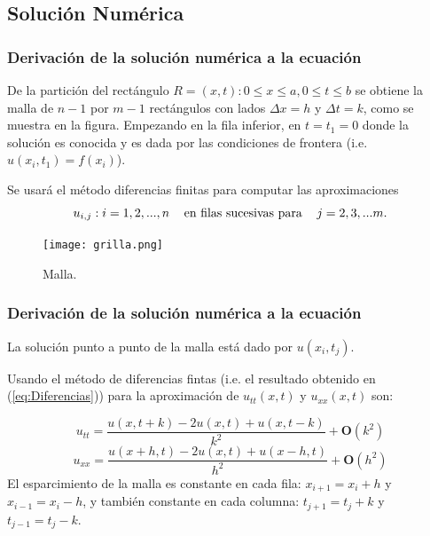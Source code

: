 \documentclass{beamer}
\begin{document}
\begin{frame}
\section{Solución Numérica}
\frametitle{Derivación de la solución numérica a la ecuación}
De la partición del rectángulo $R={(x,t):0\leq x\leq a, 0\leq t\leq b}$ se obtiene la malla de $n-1$ por $m-1$ rectángulos con lados $\Delta x =h$ y $\Delta  t=k$, como se muestra en la figura.
Empezando en la fila inferior, en $t=t_1=0$ donde la solución es conocida y es dada por las condiciones de frontera (i.e. $u(x_i,t_1)=f(x_i)$).

Se usará el método diferencias finitas para computar las aproximaciones
\begin{equation*}
    {u_{i,j}:i=1,2,...,n}\hspace{0.3cm} \text{ en filas sucesivas para }\hspace{0.3cm} j=2,3,...m.
\end{equation*}

\begin{figure}[h]
\centering
\texttt{[image: grilla.png]}
\caption{\label{fig:PenduloBalistico}Malla.}
\end{figure}
\end{frame}


\begin{frame}
\frametitle{Derivación de la solución numérica a la ecuación}
La solución punto a punto de la malla está dado por $u(x_i,t_j)$.
\newline

Usando el método de diferencias fintas (i.e. el resultado obtenido en (\ref{eq:Diferencias})) para la  aproximación de $u_{tt}(x,t)$ y $u_{xx}(x,t)$ son:

\begin{equation}\label{eq:expt}
    u_{tt}=\frac{u(x,t+k)-2u(x,t)+u(x,t-k)}{k^2}+\textbf{O}(k^2)
\end{equation}
\begin{equation}\label{eq:expx}
    u_{xx}=\frac{u(x+h,t)-2u(x,t)+u(x-h,t)}{h^2}+\textbf{O}(h^2)
\end{equation}
El esparcimiento de la malla es constante en cada fila: $x_{i+1}=x_i+h$ y $x_{i-1}=x_i-h$, y también constante en cada columna: $t_{j+1}=t_j+k$ y $t_{j-1}=t_j-k$. 
\end{frame}

\end{document}
